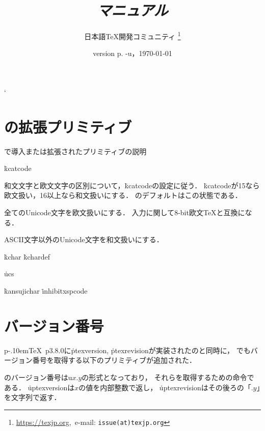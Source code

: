 \documentclass[uplatex,a4paper,11pt,nomag]{jsarticle}
\def\pTeX{p\kern-.10em\TeX}
\begin{document}
\catcode`
\title{\emph{\upTeX マニュアル}}
\author{日本語\TeX 開発コミュニティ\null
\thanks{\url{https://texjp.org},\ e-mail: \texttt{issue(at)texjp.org}}}
\date{version p\the\ptexversion.\the\ptexminorversion\ptexrevision
             -u\the\uptexversion\uptexrevision，\today}
\maketitle

\tableofcontents

\newpage

\section{\upTeX の拡張プリミティブ}

\upTeX で導入または拡張されたプリミティブの説明

\.{kcatcode}%

\begin{cslist}
 \csitem[\.{enablecjktoken}]
  和文文字と欧文文字の区別について，\.{kcatcode}の設定に従う．
  \.{kcatcode}が15なら欧文扱い，16以上なら和文扱いにする．
  \upTeX のデフォルトはこの状態である．

 \csitem[\.{disablecjktoken}]
  全てのUnicode文字を欧文扱いにする．
  入力に関して8-bit欧文\TeX と互換になる．

 \csitem[\.{forcecjktoken}]
  ASCII文字以外のUnicode文字を和文扱いにする．
\end{cslist}

\.{kchar}
\.{kchardef}

\.{ucs}

\.{kansujichar}
\.{inhibitxspcode}

\section{バージョン番号}

\pTeX~p3.8.0に\.{ptexversion}, \.{ptexrevision}が実装されたのと同時に，
\upTeX でもバージョン番号を取得する以下のプリミティブが追加された．

\begin{cslist}
  \upTeX のバージョン番号はu$x{.}y$の形式となっており，
  それらを取得するための命令である．
  \.{uptexversion}は$x$の値を内部整数で返し，
  \.{uptexrevision}はその後ろの「${.}y$」を文字列で返す．
\end{cslist}


\newpage


\begin{thebibliography}{99}
\end{thebibliography}

\newpage
\printindex
\end{document}
